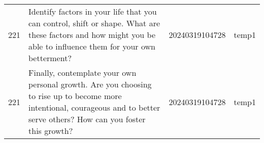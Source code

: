 \begin{longtable}{rlll}
221 &                                                                                                                                                                                                                                                                                                                                                                                                                                                                                                                                                                                                                                                                                                                                                                                                     Identify factors in your life that you can control, shift or shape. What are these factors and how might you be able to influence them for your own betterment? & 20240319104728 &       temp1 \\
221 &                                                                                                                                                                                                                                                                                                                                                                                                                                                                                                                                                                                                                                                                                                                                                                                       Finally, contemplate your own personal growth. Are you choosing to rise up to become more intentional, courageous and to better serve others? How can you foster this growth? & 20240319104728 &       temp1 \\
\end{longtable}
